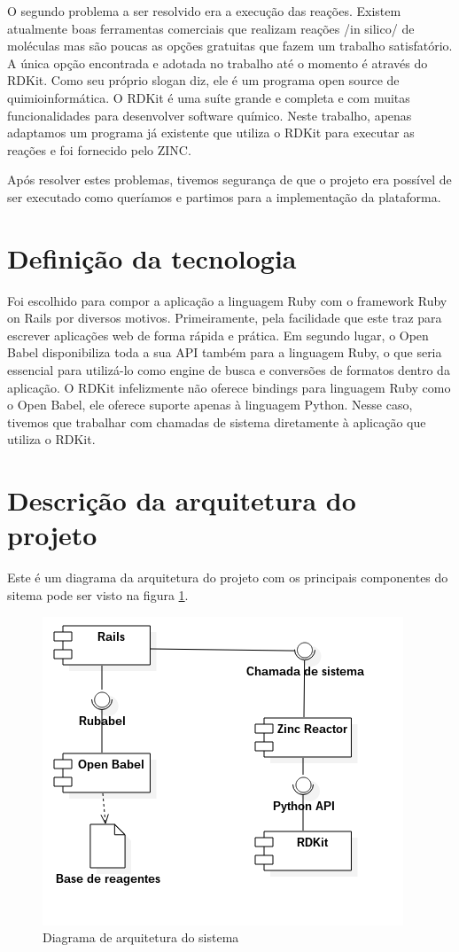 \documentclass{abnt}
\begin{document}
O segundo problema a ser resolvido era a execução das reações. Existem atualmente
boas ferramentas comerciais que realizam reações /in silico/ de moléculas mas são
poucas as opções gratuitas que fazem um trabalho satisfatório. A única opção encontrada
e adotada no trabalho até o momento é através do RDKit. Como seu próprio slogan diz,
ele é um programa open source de quimioinformática. O RDKit é uma suíte grande e
completa e com muitas funcionalidades para desenvolver software químico. Neste trabalho,
apenas adaptamos um programa já existente que utiliza o RDKit para executar as reações
e foi fornecido pelo ZINC.

Após resolver estes problemas, tivemos segurança de que o projeto era possível de
ser executado como queríamos e partimos para a implementação da plataforma.

\section{Definição da tecnologia}

Foi escolhido para compor a aplicação a linguagem Ruby com o framework Ruby on Rails
por diversos motivos. Primeiramente, pela facilidade que este traz para escrever
aplicações web de forma rápida e prática. Em segundo lugar, o Open Babel disponibiliza
toda a sua API também para a linguagem Ruby, o que seria essencial para utilizá-lo
como engine de busca e conversões de formatos dentro da aplicação. O RDKit infelizmente
não oferece bindings para linguagem Ruby como o Open Babel, ele oferece suporte
apenas à linguagem Python. Nesse caso, tivemos que trabalhar com chamadas de sistema
diretamente à aplicação que utiliza o RDKit.

\section{Descrição da arquitetura do projeto}

Este é um diagrama da arquitetura do projeto com os principais componentes do sitema
pode ser visto na figura \ref{fig:arq}.

\begin{figure}[!htb]
  \centering
  \includegraphics[scale=0.8]{diagrama_de_arquitetura.png}
  \caption{Diagrama de arquitetura do sistema}
  \label{fig:arq}
\end{figure}
\end{document}
